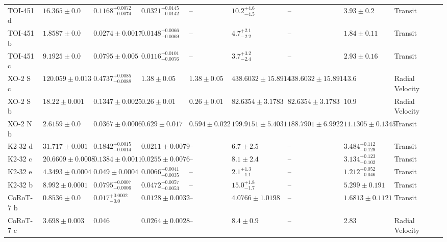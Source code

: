 \begin{tabular}{llllllllll}
TOI-451 d & $16.365 \pm 0.0$ & $0.1168^{+0.0072}_{-0.0074}$ & $0.0321^{+0.0145}_{-0.0142}$ & -- & $10.2^{+4.6}_{-4.5}$ & -- & $3.93 \pm 0.2$ & Transit & \cite{BARRAGAN_ET_AL_2026} \\
TOI-451 b & $1.8587 \pm 0.0$ & $0.0274 \pm 0.0017$ & $0.0148^{+0.0066}_{-0.0069}$ & -- & $4.7^{+2.1}_{-2.2}$ & -- & $1.84 \pm 0.11$ & Transit & \cite{BARRAGAN_ET_AL_2026} \\
TOI-451 c & $9.1925 \pm 0.0$ & $0.0795 \pm 0.005$ & $0.0116^{+0.0101}_{-0.0076}$ & -- & $3.7^{+3.2}_{-2.4}$ & -- & $2.93 \pm 0.16$ & Transit & \cite{BARRAGAN_ET_AL_2026} \\
XO-2 S c & $120.059 \pm 0.013$ & $0.4737^{+0.0085}_{-0.0088}$ & $1.38 \pm 0.05$ & $1.38 \pm 0.05$ & $438.6032 \pm 15.8914$ & $438.6032 \pm 15.8914$ & 13.6 & Radial Velocity & \cite{RUGGIERI_ET_AL_2024} \\
XO-2 S b & $18.22 \pm 0.001$ & $0.1347 \pm 0.0025$ & $0.26 \pm 0.01$ & $0.26 \pm 0.01$ & $82.6354 \pm 3.1783$ & $82.6354 \pm 3.1783$ & 10.9 & Radial Velocity & \cite{RUGGIERI_ET_AL_2024} \\
XO-2 N b & $2.6159 \pm 0.0$ & $0.0367 \pm 0.0006$ & $0.629 \pm 0.017$ & $0.594 \pm 0.022$ & $199.9151 \pm 5.4031$ & $188.7901 \pm 6.9922$ & $11.1305 \pm 0.1345$ & Transit & \cite{RUGGIERI_ET_AL_2024} \\
K2-32 d & $31.717 \pm 0.001$ & $0.1842^{+0.0015}_{-0.0014}$ & $0.0211 \pm 0.0079$ & -- & $6.7 \pm 2.5$ & -- & $3.484^{+0.112}_{-0.129}$ & Transit & \cite{LILLO_BOX_ET_AL__2020} \\
K2-32 c & $20.6609 \pm 0.0008$ & $0.1384 \pm 0.0011$ & $0.0255 \pm 0.0076$ & -- & $8.1 \pm 2.4$ & -- & $3.134^{+0.123}_{-0.102}$ & Transit & \cite{LILLO_BOX_ET_AL__2020} \\
K2-32 e & $4.3493 \pm 0.0004$ & $0.049 \pm 0.0004$ & $0.0066^{+0.0041}_{-0.0035}$ & -- & $2.1^{+1.3}_{-1.1}$ & -- & $1.212^{+0.052}_{-0.046}$ & Transit & \cite{LILLO_BOX_ET_AL__2020} \\
K2-32 b & $8.992 \pm 0.0001$ & $0.0795^{+0.0007}_{-0.0006}$ & $0.0472^{+0.0057}_{-0.0053}$ & -- & $15.0^{+1.8}_{-1.7}$ & -- & $5.299 \pm 0.191$ & Transit & \cite{LILLO_BOX_ET_AL__2020} \\
CoRoT-7 b & $0.8536 \pm 0.0$ & $0.017^{+0.0002}_{-0.0}$ & $0.0128 \pm 0.0032$ & -- & $4.0766 \pm 1.0198$ & -- & $1.6813 \pm 0.1121$ & Transit & \cite{STASSUN_ET_AL__2017} \\
CoRoT-7 c & $3.698 \pm 0.003$ & 0.046 & $0.0264 \pm 0.0028$ & -- & $8.4 \pm 0.9$ & -- & 2.83 & Radial Velocity & \cite{QUELOZ_ET_AL__2009} \\

\end{tabular}

